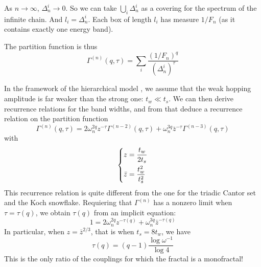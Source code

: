 \documentclass[11pt]{article}
\begin{document}
As $n \rightarrow \infty$, $\Delta^i_n \rightarrow 0$. So we can take $\bigcup_i \Delta^i_n$ as a covering for the spectrum of the infinite chain. And $l_i = \Delta^i_n$.
Each box of length $l_i$ has measure $1/F_n$ (as it contains exactly one energy band).

The partition function is thus
\begin{equation}
	\Gamma^{(n)}(q,\tau) = \sum_i \frac{(1/F_n)^q}{\left(\Delta^i_n\right)^\tau}
\end{equation}

In the framework of the hierarchical model \cite{Piechon95}, we assume that the weak hopping amplitude is far weaker than the strong one: $t_w \ll t_s$.
We can then derive recurrence relations for the band widths, and from that deduce a recurrence relation on the partition function
\begin{equation}
	\Gamma^{(n)}(q,\tau) = 2 \omega_n^{2q}z^{-\tau}\Gamma^{(n-2)}(q,\tau) + \omega_n^{3q}\bar{z}^{-\tau}\Gamma^{(n-3)}(q,\tau)
\end{equation}
with
\begin{equation}
	\begin{dcases*}
        z = \frac{t_w}{2 t_s}\\
       \bar{z} = \frac{t_w^2}{t_s^2}
     \end{dcases*}
\end{equation}
This recurrence relation is quite different from the one for the triadic Cantor set and the Koch snowflake. 
Requiering that $\Gamma^{(n)}$ has a nonzero limit when $\tau = \tau(q)$, we obtain $\tau(q)$ from an implicit equation:
\begin{equation}
	1 = 2 \omega_n^{2q} z^{-\tau(q)} + \omega_n^{3q} \bar{z}^{-\tau(q)}
\end{equation}
In particular, when $z = \bar{z}^{2/3}$, that is when $t_s = 8 t_w$, we have
\begin{equation}
	\tau(q) = (q-1)\frac{\log \omega^{-1}}{\log 4}
\end{equation}
This is the only ratio of the couplings for which the fractal is a monofractal!
{}

\end{document}
